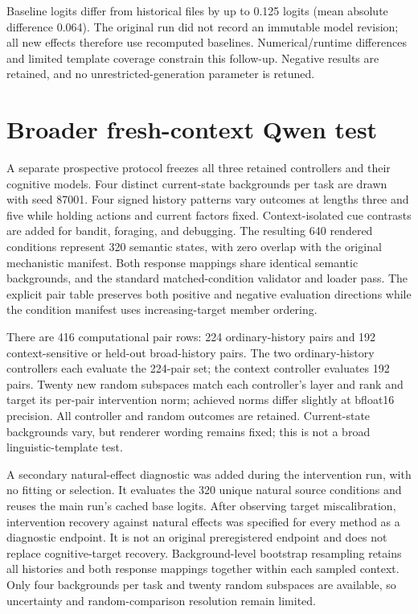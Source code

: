 \documentclass{article}
\begin{document}
Baseline logits differ from historical files by up to 0.125 logits (mean absolute difference 0.064). The original run did not record an immutable model revision; all new effects therefore use recomputed baselines. Numerical/runtime differences and limited template coverage constrain this follow-up. Negative results are retained, and no unrestricted-generation parameter is retuned.


\section{Broader fresh-context Qwen test}\label{app:freshcontexts}
A separate prospective protocol freezes all three retained controllers and their cognitive models. Four distinct current-state backgrounds per task are drawn with seed 87001. Four signed history patterns vary outcomes at lengths three and five while holding actions and current factors fixed. Context-isolated cue contrasts are added for bandit, foraging, and debugging. The resulting 640 rendered conditions represent 320 semantic states, with zero overlap with the original mechanistic manifest. Both response mappings share identical semantic backgrounds, and the standard matched-condition validator and loader pass. The explicit pair table preserves both positive and negative evaluation directions while the condition manifest uses increasing-target member ordering.

There are 416 computational pair rows: 224 ordinary-history pairs and 192 context-sensitive or held-out broad-history pairs. The two ordinary-history controllers each evaluate the 224-pair set; the context controller evaluates 192 pairs. Twenty new random subspaces match each controller's layer and rank and target its per-pair intervention norm; achieved norms differ slightly at bfloat16 precision. All controller and random outcomes are retained. Current-state backgrounds vary, but renderer wording remains fixed; this is not a broad linguistic-template test.

A secondary natural-effect diagnostic was added during the intervention run, with no fitting or selection. It evaluates the 320 unique natural source conditions and reuses the main run's cached base logits. After observing target miscalibration, intervention recovery against natural effects was specified for every method as a diagnostic endpoint. It is not an original preregistered endpoint and does not replace cognitive-target recovery. Background-level bootstrap resampling retains all histories and both response mappings together within each sampled context. Only four backgrounds per task and twenty random subspaces are available, so uncertainty and random-comparison resolution remain limited.
\end{document}
